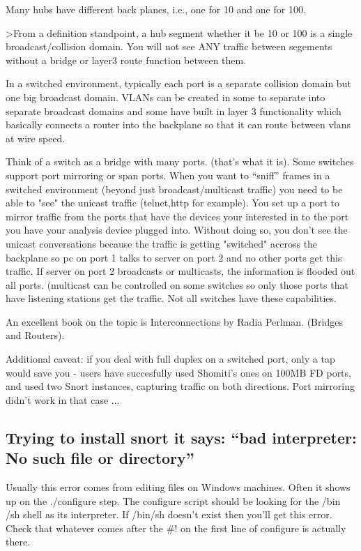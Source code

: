 \documentclass{article}
\begin{document}
Many hubs have different back planes, i.e., one for 10 and one for 100.

>From a definition standpoint, a hub segment whether it be 10 or 100 is
a single broadcast/collision domain.  You will not see ANY traffic
between segements without a bridge or layer3 route function between
them.
  
In a switched environment, typically each port is a separate collision
domain but one big broadcast domain.  VLANs can be created in some to
separate into separate broadcast domains and some have built in layer
3 functionality which basically connects a router into the backplane
so that it can route between vlans at wire speed.
  
Think of a switch as a bridge with many ports.  (that's what it is).
Some switches support port mirroring or span ports.  When you want to
``sniff'' frames in a switched environment (beyond just
broadcast/multicast traffic) you need to be able to "see" the unicast
traffic (telnet,http for example).  You set up a port to mirror
traffic from the ports that have the devices your interested in to the
port you have your analysis device plugged into.  Without doing so,
you don't see the unicast conversations because the traffic is getting
"switched" accross the backplane so pc on port 1 talks to server on
port 2 and no other ports get this traffic. If server on port 2
broadcasts or multicasts, the information is flooded out all ports.
(multicast can be controlled on some switches so only those ports that
have listening stations get the traffic.  Not all switches have these
capabilities.
  
An excellent book on the topic is Interconnections by Radia Perlman.
(Bridges and Routers).
  
Additional caveat: if you deal with full duplex on a switched port,
only a tap would save you - users have succesfully used Shomiti's
ones on 100MB FD ports, and used two Snort instances, capturing
traffic on both directions. Port mirroring didn't work in that case ...

\subsection{Trying to install snort it says: ``bad interpreter: No such file or
directory''}

Usually this error comes from editing files on Windows machines. Often it shows
up on the ./configure step. The configure script should be looking for the /bin
/sh shell as its interpreter. If /bin/sh doesn't exist then you'll get this
error. Check that whatever comes after the \#! on the first line of configure is
actually there.
\end{document}
